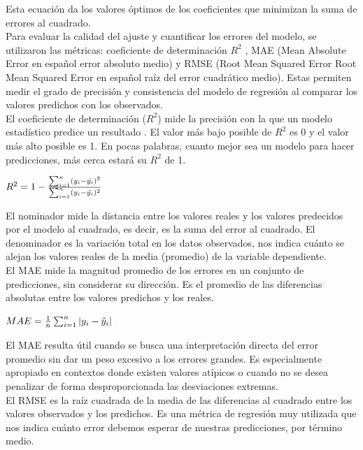 \documentclass{article}
\begin{document}
{Esta ecuación da los valores óptimos de los coeficientes que minimizan la suma de errores al cuadrado.\\

Para evaluar la calidad del ajuste y cuantificar los errores del modelo, se utilizaron las métricas: coeficiente de determinación $R^2$ ,  MAE (Mean Absolute Error en español error absoluto medio) y RMSE (Root Mean Squared Error Root Mean Squared Error en español raíz del error cuadrático medio). Estas permiten medir el grado de precisión y consistencia del modelo de regresión al comparar los valores predichos con los observados.\\

El coeficiente de determinación ($R^2$) mide la precisión con la que un modelo estadístico predice un resultado \cite{coef_determinacion}. El valor más bajo posible de $R^2$ es 0 y el valor más alto posible es 1. En pocas palabras, cuanto mejor sea un modelo para hacer predicciones, más cerca estará su $R^2$ de 1.


\begin{math}
R^2=1-\frac{\sum_{i=1}^{n} (y_i-\hat{y_i})^2}{\sum_{i=1}^{n} (y_i-\bar{y_i})^2}  \\
\end{math}

El nominador mide la distancia entre los valores reales y los valores predecidos por el modelo al cuadrado, es decir, es la suma del error al cuadrado. El denominador es la variación total en los datos observados, nos indica cuánto se alejan los valores reales de la media (promedio) de la variable dependiente.\\

El MAE\cite{mae_datacamp} mide la magnitud promedio de los errores en un conjunto de predicciones, sin considerar su dirección. Es el promedio de las diferencias absolutas entre los valores predichos y los reales.

\begin{math}
MAE=\frac{1}{n}\sum_{i=1}^{n} \left|y_i-\hat{y}_i\right| \\
\end{math}

El MAE resulta útil cuando se busca una interpretación directa del error promedio sin dar un peso excesivo a los errores grandes. Es especialmente apropiado en contextos donde existen valores atípicos o cuando no se desea penalizar de forma desproporcionada las desviaciones extremas.\\

El RMSE\cite{rmse_datacamp} es la raíz cuadrada de la media de las diferencias al cuadrado entre los valores observados y los predichos. Es una métrica de regresión muy utilizada que nos indica cuánto error debemos esperar de nuestras predicciones, por término medio. 

}
\end{document}
